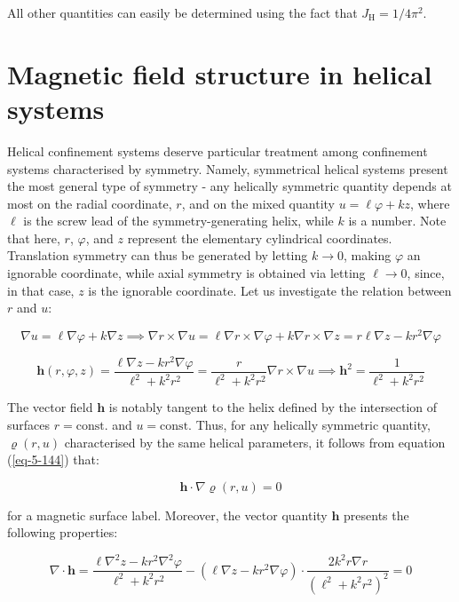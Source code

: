 All other quantities can easily be determined using the fact that $J_\text{H}=1/4\pi^2$.

\section{Magnetic field structure in helical systems}

\label{subsec-helical-structure}

Helical confinement systems deserve particular treatment among confinement systems characterised by symmetry. Namely, symmetrical helical systems present the most general type of symmetry - any helically symmetric quantity depends at most on the radial coordinate, $r$, and on the mixed quantity $u=\ell\varphi+kz$, where $\ell$ is the screw lead of the symmetry-generating helix, while $k$ is a number. Note that here, $r$, $\varphi$, and $z$ represent the elementary cylindrical coordinates. Translation symmetry can thus be generated by letting $k\to0$, making $\varphi$ an ignorable coordinate, while axial symmetry is obtained via letting $\ell\to0$, since, in that case, $z$ is the ignorable coordinate. Let us investigate the relation between $r$ and $u$:

\begin{equation}
    \nabla u=\ell\nabla\varphi+k\nabla z\implies\nabla r\times\nabla u=\ell\nabla r\times\nabla\varphi+k\nabla r\times\nabla z=r\ell\nabla z-kr^2\nabla\varphi
\end{equation}

\begin{equation}
    \label{eq-5-144}
    \mathbf{h}(r,\varphi,z)=\frac{\ell\nabla z-kr^2\nabla\varphi}{\ell^2+k^2r^2}=\frac{r}{\ell^2+k^2r^2}\nabla r\times\nabla u\implies\mathbf{h}^2=\frac{1}{\ell^2+k^2r^2}
\end{equation}

The vector field $\mathbf{h}$ is notably tangent to the helix defined by the intersection of surfaces $r=\text{const.}$ and $u=\text{const.}$ Thus, for any helically symmetric quantity, $\varrho(r,u)$ characterised by the same helical parameters, it follows from equation (\ref{eq-5-144}) that:

\begin{equation}
    \mathbf{h}\cdot\nabla\varrho(r,u)=0
\end{equation}

for a magnetic surface label. Moreover, the vector quantity $\mathbf{h}$ presents the following properties:

\begin{equation}
    \label{eq-5-146}
    \nabla\cdot\mathbf{h}=\frac{\ell\nabla^2z-kr^2\nabla^2\varphi}{\ell^2+k^2r^2}-\left(\ell\nabla z-kr^2\nabla\varphi\right)\cdot\frac{2k^2r\nabla r}{(\ell^2+k^2r^2)^2}=0
\end{equation}

